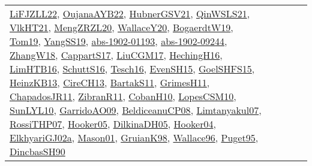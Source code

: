 {\begin{longtable}{lp{3cm}>{\raggedright}p{6cm}>{\raggedright}p{6cm}p{8cm}}
\href{papers/LiFJZLL22.pdf}{LiFJZLL22}\cite{LiFJZLL22}, \href{papers/OujanaAYB22.pdf}{OujanaAYB22}\cite{OujanaAYB22}, \href{articles/HubnerGSV21.pdf}{HubnerGSV21}\cite{HubnerGSV21}, \href{articles/QinWSLS21.pdf}{QinWSLS21}\cite{QinWSLS21}, \href{articles/VlkHT21.pdf}{VlkHT21}\cite{VlkHT21}, \href{articles/MengZRZL20.pdf}{MengZRZL20}\cite{MengZRZL20}, \href{articles/WallaceY20.pdf}{WallaceY20}\cite{WallaceY20}, \href{papers/BogaerdtW19.pdf}{BogaerdtW19}\cite{BogaerdtW19}, \href{papers/Tom19.pdf}{Tom19}\cite{Tom19}, \href{papers/YangSS19.pdf}{YangSS19}\cite{YangSS19}, \href{articles/abs-1902-01193.pdf}{abs-1902-01193}\cite{abs-1902-01193}, \href{articles/abs-1902-09244.pdf}{abs-1902-09244}\cite{abs-1902-09244}, \href{articles/ZhangW18.pdf}{ZhangW18}\cite{ZhangW18}, \href{papers/CappartS17.pdf}{CappartS17}\cite{CappartS17}, \href{papers/LiuCGM17.pdf}{LiuCGM17}\cite{LiuCGM17}, \href{papers/HechingH16.pdf}{HechingH16}\cite{HechingH16}, \href{papers/LimHTB16.pdf}{LimHTB16}\cite{LimHTB16}, \href{papers/SchuttS16.pdf}{SchuttS16}\cite{SchuttS16}, \href{papers/Tesch16.pdf}{Tesch16}\cite{Tesch16}, \href{papers/EvenSH15.pdf}{EvenSH15}\cite{EvenSH15}, \href{articles/GoelSHFS15.pdf}{GoelSHFS15}\cite{GoelSHFS15}, \href{papers/HeinzKB13.pdf}{HeinzKB13}\cite{HeinzKB13}, \href{papers/CireCH13.pdf}{CireCH13}\cite{CireCH13}, \href{articles/BartakS11.pdf}{BartakS11}\cite{BartakS11}, \href{papers/GrimesH11.pdf}{GrimesH11}\cite{GrimesH11}, \href{papers/ChapadosJR11.pdf}{ChapadosJR11}\cite{ChapadosJR11}, \href{papers/ZibranR11.pdf}{ZibranR11}\cite{ZibranR11}, \href{papers/CobanH10.pdf}{CobanH10}\cite{CobanH10}, \href{articles/LopesCSM10.pdf}{LopesCSM10}\cite{LopesCSM10}, \href{papers/SunLYL10.pdf}{SunLYL10}\cite{SunLYL10}, \href{articles/GarridoAO09.pdf}{GarridoAO09}\cite{GarridoAO09}, \href{papers/BeldiceanuCP08.pdf}{BeldiceanuCP08}\cite{BeldiceanuCP08}, \href{papers/Limtanyakul07.pdf}{Limtanyakul07}\cite{Limtanyakul07}, \href{papers/RossiTHP07.pdf}{RossiTHP07}\cite{RossiTHP07}, \href{articles/Hooker05.pdf}{Hooker05}\cite{Hooker05}, \href{papers/DilkinaDH05.pdf}{DilkinaDH05}\cite{DilkinaDH05}, \href{papers/Hooker04.pdf}{Hooker04}\cite{Hooker04}, \href{papers/ElkhyariGJ02a.pdf}{ElkhyariGJ02a}\cite{ElkhyariGJ02a}, \href{articles/Mason01.pdf}{Mason01}\cite{Mason01}, \href{papers/GruianK98.pdf}{GruianK98}\cite{GruianK98}, \href{articles/Wallace96.pdf}{Wallace96}\cite{Wallace96}, \href{papers/Puget95.pdf}{Puget95}\cite{Puget95}, \href{articles/DincbasSH90.pdf}{DincbasSH90}\cite{DincbasSH90}\\

\end{longtable}}
